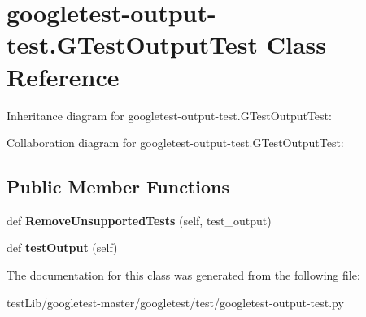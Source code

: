 \hypertarget{classgoogletest-output-test_1_1GTestOutputTest}{}\section{googletest-\/output-\/test.G\+Test\+Output\+Test Class Reference}
\label{classgoogletest-output-test_1_1GTestOutputTest}


Inheritance diagram for googletest-\/output-\/test.G\+Test\+Output\+Test\+:


Collaboration diagram for googletest-\/output-\/test.G\+Test\+Output\+Test\+:
\subsection*{Public Member Functions}
\begin{DoxyCompactItemize}
\item 
\mbox{\label{classgoogletest-output-test_1_1GTestOutputTest_af058c7917b05d06b0e6249061db264a3}} 
def {\bfseries Remove\+Unsupported\+Tests} (self, test\+\_\+output)
\item 
\mbox{\label{classgoogletest-output-test_1_1GTestOutputTest_a4ab77925377e6c837d33f07960a31212}} 
def {\bfseries test\+Output} (self)
\end{DoxyCompactItemize}


The documentation for this class was generated from the following file\+:\begin{DoxyCompactItemize}
\item 
test\+Lib/googletest-\/master/googletest/test/googletest-\/output-\/test.\+py\end{DoxyCompactItemize}
